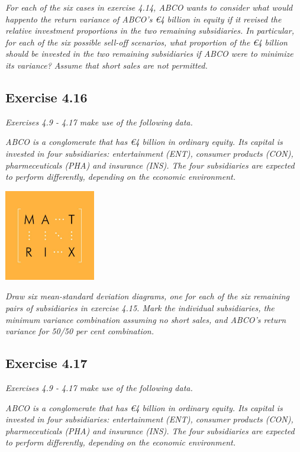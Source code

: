 \documentclass[]{book}
\newcommand{\euro}{€}
\theoremstyle{definition}
\theoremstyle{definition}
\theoremstyle{remark}
\begin{document}
\emph{For each of the six cases in exercise 4.14, ABCO wants to consider
what would happento the return variance of ABCO's \euro{}4 billion in
equity if it revised the relative investment proportions in the two
remaining subsidiaries. In particular, for each of the six possible
sell-off scenarios, what proportion of the \euro{}4 billion should be
invested in the two remaining subsidiaries if ABCO were to minimize its
variance? Assume that short sales are not permitted.}
\citep[p.118]{book}

\subsection{Exercise 4.16}\label{exercise-4.16}

\emph{Exercises 4.9 - 4.17 make use of the following data.}
\citep[p.117]{book}

\emph{ABCO is a conglomerate that has \euro{}4 billion in ordinary
equity. Its capital is invested in four subsidiaries: entertainment
(ENT), consumer products (CON), pharmeceuticals (PHA) and insurance
(INS). The four subsidiaries are expected to perform differently,
depending on the economic environment.} \citep[p.117]{book}

\begin{center}\includegraphics[width=150px]{figures/matrix} \end{center}

\emph{Draw six mean-standard deviation diagrams, one for each of the six
remaining pairs of subsidiaries in exercise 4.15. Mark the individual
subsidiaries, the minimum variance combination assuming no short sales,
and ABCO's return variance for 50/50 per cent combination.}
\citep[p.118]{book}

\subsection{Exercise 4.17}\label{exercise-4.17}

\emph{Exercises 4.9 - 4.17 make use of the following data.}
\citep[p.117]{book}

\emph{ABCO is a conglomerate that has \euro{}4 billion in ordinary
equity. Its capital is invested in four subsidiaries: entertainment
(ENT), consumer products (CON), pharmeceuticals (PHA) and insurance
(INS). The four subsidiaries are expected to perform differently,
depending on the economic environment.} \citep[p.117]{book}
\end{document}
